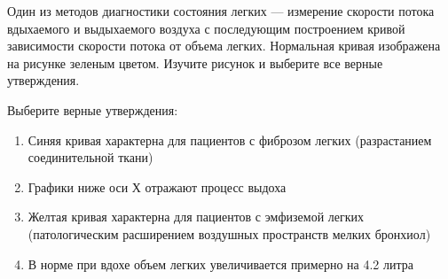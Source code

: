 
Один из методов
диагностики состояния легких — измерение скорости потока вдыхаемого и
выдыхаемого воздуха с последующим построением кривой зависимости скорости
потока от объема легких. Нормальная кривая изображена на рисунке зеленым
цветом. Изучите рисунок и выберите все верные утверждения.


Выберите верные утверждения:

\begin{enumerate}
    \item Синяя кривая характерна для пациентов с фиброзом легких (разрастанием соединительной ткани)
    \item Графики ниже оси Х отражают процесс выдоха
    \item Желтая кривая характерна для пациентов с эмфиземой легких (патологическим расширением воздушных пространств мелких бронхиол)
    \item В норме при вдохе объем легких увеличивается примерно на 4.2 литра
\end{enumerate}




